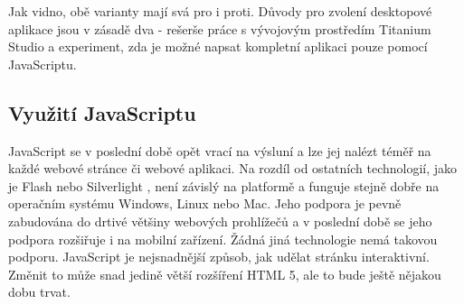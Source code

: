 Jak vidno, obě varianty mají svá pro i proti. Důvody pro zvolení desktopové aplikace jsou v zásadě dva - rešerše práce s vývojovým prostředím Titanium Studio a experiment, zda je možné napsat kompletní aplikaci pouze pomocí JavaScriptu. 

\subsection{Využití JavaScriptu}

JavaScript se v poslední době opět vrací na výsluní a lze jej nalézt téměř na každé webové stránce či webové aplikaci. Na rozdíl od ostatních technologií, jako je Flash \cite{flash} nebo Silverlight \cite{silverlight}, není závislý na platformě a funguje stejně dobře na operačním systému Windows, Linux nebo Mac. Jeho podpora je pevně zabudována do drtivé většiny webových prohlížečů a v poslední době se jeho podpora rozšiřuje i na mobilní zařízení. Žádná jiná technologie nemá takovou podporu. JavaScript je nejsnadnější způsob, jak udělat stránku interaktivní. Změnit to může snad jedině větší rozšíření HTML 5, ale to bude ještě nějakou dobu trvat.